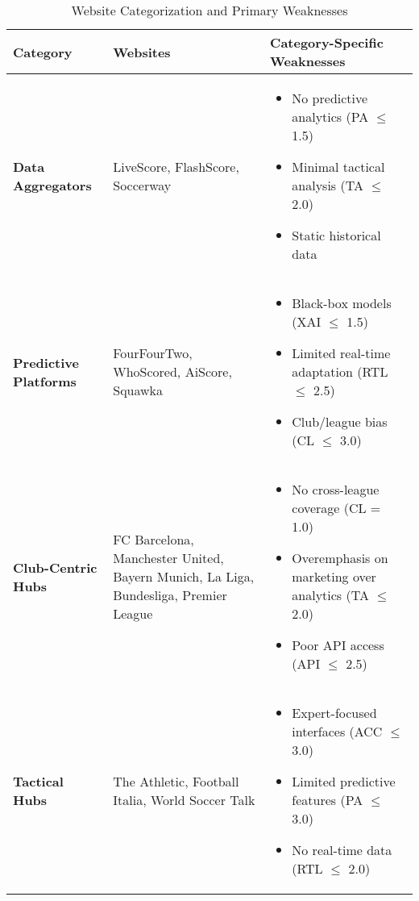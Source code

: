 \begin{table}[h!]
    \centering
    \caption{Website Categorization and Primary Weaknesses}
    \label{tab:website-categories}
    \scriptsize
    \begin{tabularx}{\textwidth}{|>{\raggedright\arraybackslash}p{2.5cm}|>{\raggedright\arraybackslash}p{3.5cm}|X|}
        \hline
        \textbf{Category} & \textbf{Websites} & \textbf{Category-Specific Weaknesses} \\
        \hline
        \textbf{Data Aggregators} & LiveScore, FlashScore, Soccerway & 
        \begin{itemize}
            \item No predictive analytics (PA $\leq$ 1.5)
            \item Minimal tactical analysis (TA $\leq$ 2.0)
            \item Static historical data
        \end{itemize} \\
        \hline
        \textbf{Predictive Platforms} & FourFourTwo, WhoScored, AiScore, Squawka & 
        \begin{itemize}
            \item Black-box models (XAI $\leq$ 1.5)
            \item Limited real-time adaptation (RTL $\leq$ 2.5)
            \item Club/league bias (CL $\leq$ 3.0)
        \end{itemize} \\
        \hline
        \textbf{Club-Centric Hubs} & FC Barcelona, Manchester United, Bayern Munich, La Liga, Bundesliga, Premier League & 
        \begin{itemize}
            \item No cross-league coverage (CL = 1.0)
            \item Overemphasis on marketing over analytics (TA $\leq$ 2.0)
            \item Poor API access (API $\leq$ 2.5)
        \end{itemize} \\
        \hline
        \textbf{Tactical Hubs} & The Athletic, Football Italia, World Soccer Talk & 
        \begin{itemize}
            \item Expert-focused interfaces (ACC $\leq$ 3.0)
            \item Limited predictive features (PA $\leq$ 3.0)
            \item No real-time data (RTL $\leq$ 2.0)

\end{itemize}
\end{tabularx}
\end{table}
